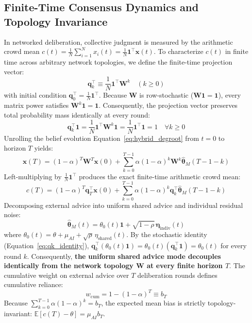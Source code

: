 \documentclass
[letterpaper]{article}
\begin{document}
\subsection{Finite-Time Consensus Dynamics and Topology Invariance}
\label{sec:mean_field_decomposition}
In networked deliberation, collective judgment is measured by the arithmetic crowd mean $c(t) = \frac{1}{N}\sum_{i=1}^N x_i(t) = \frac{1}{N}\mathbf{1}^\top \mathbf{x}(t)$. To characterize $c(t)$ in finite time across arbitrary network topologies, we define the finite-time projection vector:
\begin{equation}
\mathbf{q}_k^\top \equiv \frac{1}{N} \mathbf{1}^\top \mathbf{W}^k \quad (k \ge 0)
\end{equation}
with initial condition $\mathbf{q}_0^\top = \frac{1}{N}\mathbf{1}^\top$. Because $\mathbf{W}$ is row-stochastic ($\mathbf{W}\mathbf{1} = \mathbf{1}$), every matrix power satisfies $\mathbf{W}^k \mathbf{1} = \mathbf{1}$. Consequently, the projection vector preserves total probability mass identically at every round:
\begin{equation}
\mathbf{q}_k^\top \mathbf{1} = \frac{1}{N}\mathbf{1}^\top \mathbf{W}^k \mathbf{1} = \frac{1}{N}\mathbf{1}^\top \mathbf{1} = 1 \quad \forall k \ge 0
\label{eq:qk_identity}
\end{equation}
Unrolling the belief evolution Equation~\ref{eq:hybrid_degroot} from $t = 0$ to horizon $T$ yields:
\begin{equation}
\mathbf{x}(T) = (1 - \alpha)^T \mathbf{W}^T \mathbf{x}(0) + \sum_{k=0}^{T-1} \alpha (1 - \alpha)^k \mathbf{W}^k \hat{\boldsymbol{\theta}}_M(T-1-k)
\end{equation}
Left-multiplying by $\frac{1}{N}\mathbf{1}^\top$ produces the exact finite-time arithmetic crowd mean:
\begin{equation}
c(T) = (1 - \alpha)^T \mathbf{q}_T^\top \mathbf{x}(0) + \sum_{k=0}^{T-1} \alpha (1 - \alpha)^k \mathbf{q}_k^\top \hat{\boldsymbol{\theta}}_M(T-1-k)
\label{eq:cT_exact}
\end{equation}
Decomposing external advice into uniform shared advice and individual residual noise:
\begin{equation}
\hat{\boldsymbol{\theta}}_M(t) = \theta_0(t) \mathbf{1} + \sqrt{1 - \rho} \, \boldsymbol{\eta}_{\text{indiv}}(t)
\end{equation}
where $\theta_0(t) = \theta + \mu_{AI} + \sqrt{\rho}\,\eta_{\text{shared}}(t)$. By the stochastic identity (Equation~\ref{eq:qk_identity}), $\mathbf{q}_k^\top (\theta_0(t)\mathbf{1}) = \theta_0(t) (\mathbf{q}_k^\top \mathbf{1}) = \theta_0(t)$ for every round $k$. Consequently, \textbf{the uniform shared advice mode decouples identically from the network topology $\mathbf{W}$ at every finite horizon $T$}. The cumulative weight on external advice over $T$ deliberation rounds defines cumulative reliance:
\begin{equation}
\boxed{w_{\text{cum}} = 1 - (1 - \alpha)^T \equiv b_T}
\end{equation}
Because $\sum_{k=0}^{T-1} \alpha (1 - \alpha)^k = b_T$, the expected mean bias is strictly topology-invariant: $\mathbb{E}[c(T) - \theta] = \mu_{AI} b_T$.
\end{document}
